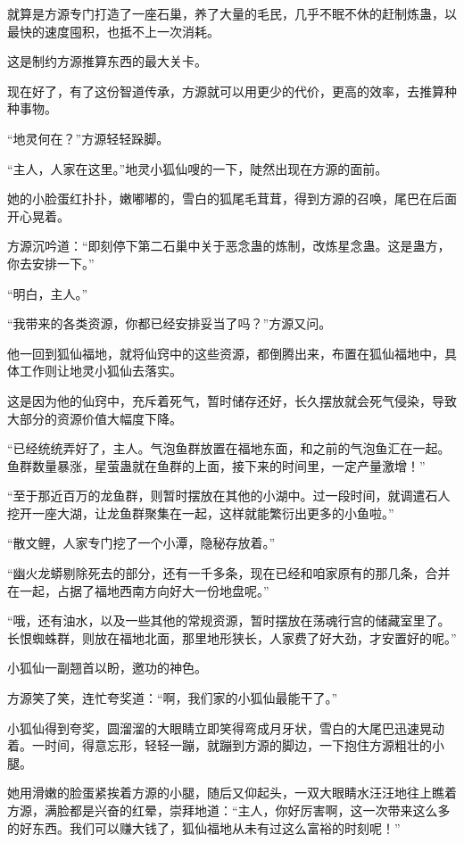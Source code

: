 \begin{this_body}
就算是方源专门打造了一座石巢，养了大量的毛民，几乎不眠不休的赶制炼蛊，以最快的速度囤积，也抵不上一次消耗。

这是制约方源推算东西的最大关卡。

现在好了，有了这份智道传承，方源就可以用更少的代价，更高的效率，去推算种种事物。

“地灵何在？”方源轻轻跺脚。

“主人，人家在这里。”地灵小狐仙嗖的一下，陡然出现在方源的面前。

她的小脸蛋红扑扑，嫩嘟嘟的，雪白的狐尾毛茸茸，得到方源的召唤，尾巴在后面开心晃着。

方源沉吟道：“即刻停下第二石巢中关于恶念蛊的炼制，改炼星念蛊。这是蛊方，你去安排一下。”

“明白，主人。”

“我带来的各类资源，你都已经安排妥当了吗？”方源又问。

他一回到狐仙福地，就将仙窍中的这些资源，都倒腾出来，布置在狐仙福地中，具体工作则让地灵小狐仙去落实。

这是因为他的仙窍中，充斥着死气，暂时储存还好，长久摆放就会死气侵染，导致大部分的资源价值大幅度下降。

“已经统统弄好了，主人。气泡鱼群放置在福地东面，和之前的气泡鱼汇在一起。鱼群数量暴涨，星萤蛊就在鱼群的上面，接下来的时间里，一定产量激增！”

“至于那近百万的龙鱼群，则暂时摆放在其他的小湖中。过一段时间，就调遣石人挖开一座大湖，让龙鱼群聚集在一起，这样就能繁衍出更多的小鱼啦。”

“散文鲤，人家专门挖了一个小潭，隐秘存放着。”

“幽火龙蟒剔除死去的部分，还有一千多条，现在已经和咱家原有的那几条，合并在一起，占据了福地西南方向好大一份地盘呢。”

“哦，还有油水，以及一些其他的常规资源，暂时摆放在荡魂行宫的储藏室里了。长恨蜘蛛群，则放在福地北面，那里地形狭长，人家费了好大劲，才安置好的呢。”

小狐仙一副翘首以盼，邀功的神色。

方源笑了笑，连忙夸奖道：“啊，我们家的小狐仙最能干了。”

小狐仙得到夸奖，圆溜溜的大眼睛立即笑得弯成月牙状，雪白的大尾巴迅速晃动着。一时间，得意忘形，轻轻一蹦，就蹦到方源的脚边，一下抱住方源粗壮的小腿。

她用滑嫩的脸蛋紧挨着方源的小腿，随后又仰起头，一双大眼睛水汪汪地往上瞧着方源，满脸都是兴奋的红晕，崇拜地道：“主人，你好厉害啊，这一次带来这么多的好东西。我们可以赚大钱了，狐仙福地从未有过这么富裕的时刻呢！”


\end{this_body}
